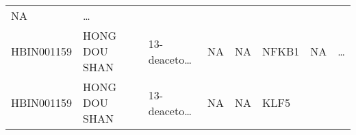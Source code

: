 \documentclass[
]{article}
\begin{document}
\begin{longtable}[]{@{}llllllll@{}}
\begin{minipage}[t]{0.11\columnwidth}
NA\strut
\end{minipage} & \begin{minipage}[t]{0.03\columnwidth}\raggedright
\ldots{}\strut
\end{minipage}\tabularnewline
\begin{minipage}[t]{0.11\columnwidth}\raggedright
HBIN001159\strut
\end{minipage} & \begin{minipage}[t]{0.11\columnwidth}\raggedright
HONG DOU SHAN\strut
\end{minipage} & \begin{minipage}[t]{0.14\columnwidth}\raggedright
13-deaceto\ldots{}\strut
\end{minipage} & \begin{minipage}[t]{0.14\columnwidth}\raggedright
NA\strut
\end{minipage} & \begin{minipage}[t]{0.08\columnwidth}\raggedright
NA\strut
\end{minipage} & \begin{minipage}[t]{0.09\columnwidth}\raggedright
NFKB1\strut
\end{minipage} & \begin{minipage}[t]{0.11\columnwidth}\raggedright
NA\strut
\end{minipage} & \begin{minipage}[t]{0.03\columnwidth}\raggedright
\ldots{}\strut
\end{minipage}\tabularnewline
\begin{minipage}[t]{0.11\columnwidth}\raggedright
HBIN001159\strut
\end{minipage} & \begin{minipage}[t]{0.11\columnwidth}\raggedright
HONG DOU SHAN\strut
\end{minipage} & \begin{minipage}[t]{0.14\columnwidth}\raggedright
13-deaceto\ldots{}\strut
\end{minipage} & \begin{minipage}[t]{0.14\columnwidth}\raggedright
NA\strut
\end{minipage} & \begin{minipage}[t]{0.08\columnwidth}\raggedright
NA\strut
\end{minipage} & \begin{minipage}[t]{0.09\columnwidth}\raggedright
KLF5\strut
\end{minipage} & \begin{minipage}[t]{0.11\columnwidth}\raggedright

\end{minipage}
\end{longtable}
\end{document}
